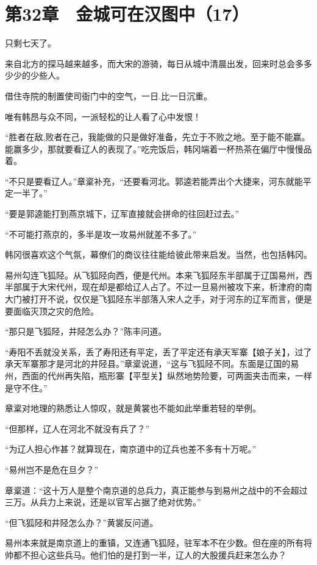 \section{第32章　金城可在汉图中（17）}

只剩七天了。

来自北方的探马越来越多，而大宋的游骑，每日从城中清晨出发，回来时总会多多少少的少些人。

借住寺院的制置使司衙门中的空气，一日.比一日沉重。

唯有韩昂与众不同，一派轻松的让人看了心中发恨！

“胜者在敌,败者在己，我能做的只是做好准备，先立于不败之地。至于能不能赢。能赢多少，那就要看辽人的表现了。”吃完饭后，韩冈端着一杯热茶在偏厅中慢慢品着。

“不只是要看辽人。”章楶补充，“还要看河北。郭逵若能弄出个大捷来，河东就能平定一半了。”

“要是郭逵能打到燕京城下，辽军直接就会拼命的往回赶过去。”

“不可能打燕京的，多半是攻一攻易州就差不多了。”

韩冈很喜欢这个气氛，幕僚们的商议往往能给彼此带来启发。当然，也包括韩冈。

易州勾连飞狐陉。从飞狐陉向西，便是代州。本来飞狐陉东半部属于辽国易州，西半部属于大宋代州，现在却是都给辽人占了。不过一旦易州被攻下来，析津府的南大门被打开不说，仅仅是飞狐陉东半部落入宋人之手，对于河东的辽军而言，便是要面临灭顶之灾的危险。

“那只是飞狐陉，井陉怎么办？”陈丰问道。

“寿阳不丢就没关系，丢了寿阳还有平定，丢了平定还有承天军寨【娘子关】，过了承天军寨那才是河北的井陉县。”章楶说道，“这与飞狐陉不同。东面是辽国的易州，西面的代州再失陷，瓶形寨【平型关】纵然地势险要，可两面夹击而来，一样是守不住。”

章楶对地理的熟悉让人惊叹，就是黄裳也不能如此举重若轻的举例。

“但那样，辽人在河北不就没有兵了？”

“为辽人担心作甚？就算现在，南京道中的辽兵也差不多有十万呢。”

“易州岂不是危在旦夕？”

章楶道：“这十万人是整个南京道的总兵力，真正能参与到易州之战中的不会超过三万。从兵力上来说，还是以官军占据了绝对优势。”

“但飞狐陉和井陉怎么办？”黄裳反问道。

易州本来就是南京道上的重镇，又连通飞狐陉，驻军本不在少数。但在座的所有将帅都不担心这些兵马。他们怕的是打到一半，辽人的大股援兵赶来怎么办？

